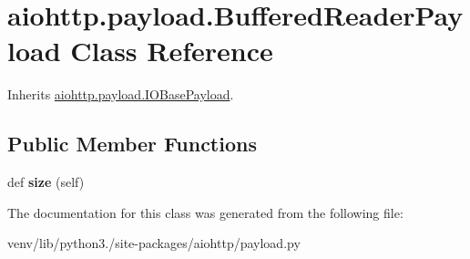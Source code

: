 \hypertarget{classaiohttp_1_1payload_1_1_buffered_reader_payload}{}\section{aiohttp.\+payload.\+Buffered\+Reader\+Payload Class Reference}
\label{classaiohttp_1_1payload_1_1_buffered_reader_payload}


Inherits \hyperlink{classaiohttp_1_1payload_1_1_i_o_base_payload}{aiohttp.\+payload.\+I\+O\+Base\+Payload}.

\subsection*{Public Member Functions}
\begin{DoxyCompactItemize}
\item 
\mbox{\label{classaiohttp_1_1payload_1_1_buffered_reader_payload_a320bbfbfe3e545b14294d0aaef690496}} 
def {\bfseries size} (self)
\end{DoxyCompactItemize}


The documentation for this class was generated from the following file\+:\begin{DoxyCompactItemize}
\item 
venv/lib/python3./site-\/packages/aiohttp/payload.\+py\end{DoxyCompactItemize}
